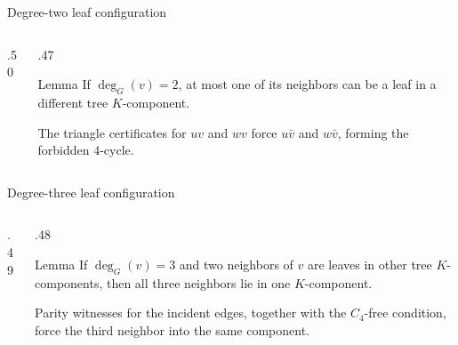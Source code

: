 \begin{frame}{Degree-two leaf configuration}
 \begin{columns}[c,onlytextwidth]
  \begin{column}{.50\textwidth}
   \begin{center}\resizebox{.94\linewidth}{!}{\DegreeTwoFig}\end{center}
  \end{column}
  \begin{column}{.47\textwidth}
   \begin{block}{Lemma}
   If \(\deg_G(v)=2\), at most one of its neighbors can be a leaf in a different tree \(K\)-component.
   \end{block}
    The triangle certificates for \(uv\) and \(wv\) force \(u\bar v\) and \(w\bar v\), forming the forbidden \(4\)-cycle.
  \end{column}
 \end{columns}
\end{frame}


\begin{frame}{Degree-three leaf configuration}
 \begin{columns}[c,onlytextwidth]
  \begin{column}{.49\textwidth}
   \begin{center}\resizebox{.86\linewidth}{!}{\DegreeThreeFig}\end{center}
  \end{column}
  \begin{column}{.48\textwidth}
   \begin{block}{Lemma}
   If \(\deg_G(v)=3\) and two neighbors of \(v\) are leaves in other tree \(K\)-components, then all three neighbors lie in one \(K\)-component.
   \end{block}
    Parity witnesses for the incident edges, together with the \(C_4\)-free condition, force the third neighbor into the same component.
  \end{column}
 \end{columns}
\end{frame}


